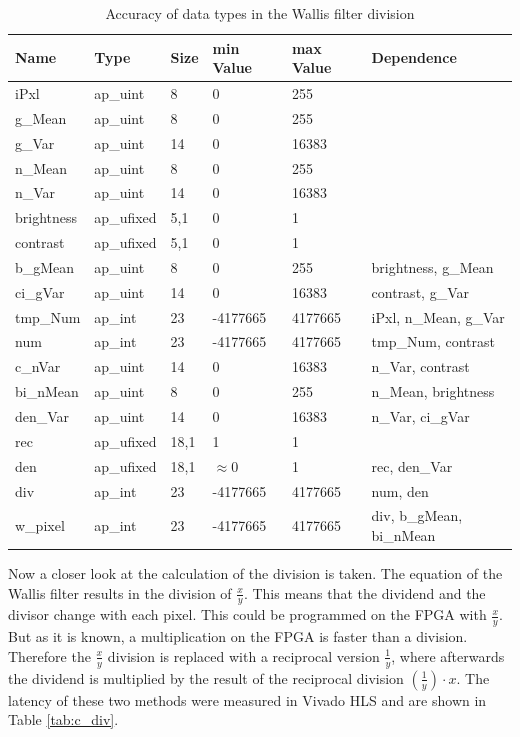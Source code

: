 \begin{table}[tb!]
    \centering
    \begin{tabularx}{\textwidth}{l l l l l l}
        \toprule
        Name & Type & Size & min Value & max Value & Dependence \\
        \midrule
        iPxl & ap\_uint & 8 & 0 & 255 & \\
        g\_Mean & ap\_uint & 8 & 0 & 255 &  \\
        g\_Var & ap\_uint & 14 & 0 & 16383 &  \\
        n\_Mean & ap\_uint & 8 & 0 & 255 &  \\
        n\_Var & ap\_uint & 14 & 0 & 16383 &  \\
        brightness & ap\_ufixed & 5,1 & 0 & 1 &  \\
        contrast & ap\_ufixed & 5,1 & 0 & 1 &  \\
        b\_gMean & ap\_uint & 8 & 0 & 255 &  brightness, g\_Mean\\
        ci\_gVar & ap\_uint & 14 & 0 & 16383 &  contrast, g\_Var\\
        tmp\_Num & ap\_int & 23 & -4177665 & 4177665 &  iPxl, n\_Mean, g\_Var \\
        num & ap\_int & 23 & -4177665 & 4177665 &  tmp\_Num, contrast \\
        c\_nVar & ap\_uint & 14 & 0 & 16383 &  n\_Var, contrast \\
        bi\_nMean & ap\_uint & 8 & 0 & 255 &  n\_Mean, brightness \\
        den\_Var & ap\_uint & 14 & 0 & 16383 &  n\_Var, ci\_gVar \\
        rec & ap\_ufixed & 18,1 & 1 & 1 &   \\
        den & ap\_ufixed & 18,1 & $\approx$0 & 1 &  rec, den\_Var \\
        div & ap\_int & 23 & -4177665 & 4177665 &  num, den \\
        w\_pixel & ap\_int & 23 & -4177665 & 4177665 &  div, b\_gMean, bi\_nMean \\
        \bottomrule
    \end{tabularx}
    \caption{Accuracy of data types in the Wallis filter division}
    \label{tab:datatypes}
\end{table}

Now a closer look at the calculation of the division is taken. The equation
of the Wallis filter results in the division of $\frac{x}{y}$. This means that
the dividend and the divisor change with each pixel. This could be programmed on
the FPGA with $\frac{x}{y}$. But as it is known, a multiplication on the FPGA is
faster than a division. Therefore the $\frac{x}{y}$ division is replaced with a
reciprocal version $\frac{1}{y}$, where afterwards the dividend is multiplied by the result of the reciprocal division $(\frac{1}{y}) \cdot x$. The latency of these two methods were measured in Vivado HLS and are shown in Table \ref{tab:c_div}. \\

